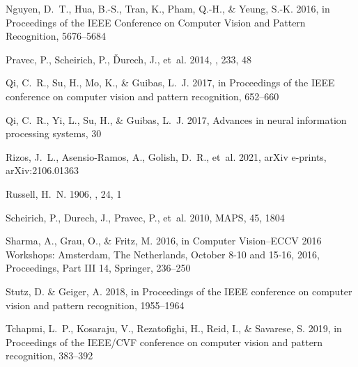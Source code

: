 \begin{thebibliography}{74}
Nguyen, D.~T., Hua, B.-S., Tran, K., Pham, Q.-H., \& Yeung, S.-K. 2016, in Proceedings of the IEEE Conference on Computer Vision and Pattern Recognition, 5676--5684

{Pravec}, P., {Scheirich}, P., {{\v{D}}urech}, J., {et~al.} 2014, \icarus, 233, 48

Qi, C.~R., Su, H., Mo, K., \& Guibas, L.~J. 2017{}, in Proceedings of the IEEE conference on computer vision and pattern recognition, 652--660

Qi, C.~R., Yi, L., Su, H., \& Guibas, L.~J. 2017{}, Advances in neural information processing systems, 30

{Rizos}, J.~L., {Asensio-Ramos}, A., {Golish}, D.~R., {et~al.} 2021, arXiv e-prints, arXiv:2106.01363

{Russell}, H.~N. 1906, \apj, 24, 1

{Scheirich}, P., {Durech}, J., {Pravec}, P., {et~al.} 2010, MAPS, 45, 1804

Sharma, A., Grau, O., \& Fritz, M. 2016, in Computer Vision--ECCV 2016 Workshops: Amsterdam, The Netherlands, October 8-10 and 15-16, 2016, Proceedings, Part III 14, Springer, 236--250

Stutz, D. \& Geiger, A. 2018, in Proceedings of the IEEE conference on computer vision and pattern recognition, 1955--1964

Tchapmi, L.~P., Kosaraju, V., Rezatofighi, H., Reid, I., \& Savarese, S. 2019, in Proceedings of the IEEE/CVF conference on computer vision and pattern recognition, 383--392


\end{thebibliography}
